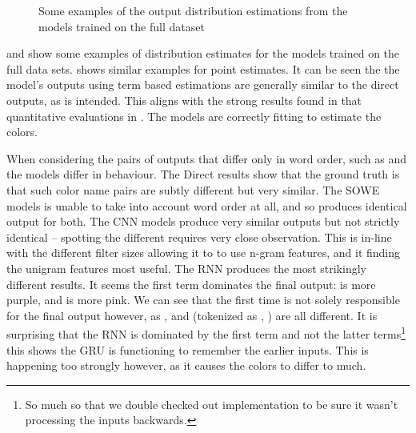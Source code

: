 \documentclass[11pt,a4paper]{article}
\begin{document}
\begin{figure}
	\caption{Some examples of the output distribution estimations from the models trained on the full dataset} \label{fig:pointout}
\end{figure}

 and  show some examples of distribution estimates for the models trained on the full data sets.
 shows similar examples for point estimates.
It can be seen the the model's outputs using term based estimations are generally similar to the direct outputs, as is intended.
This aligns with the strong results found in that quantitative evaluations in .
The models are correctly fitting to estimate the colors.

When considering the pairs of outputs that differ only in word order, such as  and  the models differ in behaviour.
The Direct results show that the ground truth is that such color name pairs are subtly different but very similar.
The SOWE models is unable to take into account word order at all, and so produces identical output for both.
The CNN models produce very similar outputs but not strictly identical -- spotting the different requires very close observation.
This is in-line with the different filter sizes allowing it to to use n-gram features, and it finding the unigram features most useful.
The RNN produces the most strikingly different results.
It seems the first term dominates the final output:  is more purple, and   is more pink.
We can see that the first time is not solely responsible for the final output however, as ,  and  (tokenized as , ) are all different.
It is surprising that the RNN is dominated by the first term and not the latter terms\footnote{So much so that we double checked out implementation to be sure it wasn't processing the inputs backwards.} this shows the GRU is functioning to remember the earlier inputs.
This is happening too strongly however, as it causes the colors to differ to much.
\end{document}
